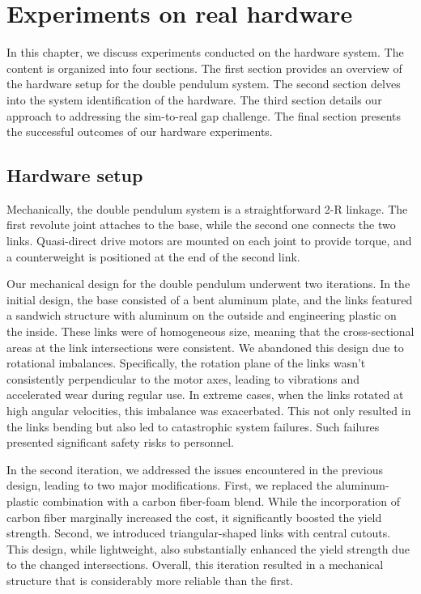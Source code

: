 \chapter{Experiments on real hardware}
In this chapter, we discuss experiments conducted on the hardware system. The content is organized into four sections. The first section provides an overview of the hardware setup for the double pendulum system. The second section delves into the system identification of the hardware. The third section details our approach to addressing the sim-to-real gap challenge. The final section presents the successful outcomes of our hardware experiments.

\section{Hardware setup}
Mechanically, the double pendulum system is a straightforward 2-R linkage. The first revolute joint attaches to the base, while the second one connects the two links. Quasi-direct drive motors are mounted on each joint to provide torque, and a counterweight is positioned at the end of the second link.

Our mechanical design for the double pendulum underwent two iterations. In the initial design, the base consisted of a bent aluminum plate, and the links featured a sandwich structure with aluminum on the outside and engineering plastic on the inside. These links were of homogeneous size, meaning that the cross-sectional areas at the link intersections were consistent. We abandoned this design due to rotational imbalances. Specifically, the rotation plane of the links wasn't consistently perpendicular to the motor axes, leading to vibrations and accelerated wear during regular use. In extreme cases, when the links rotated at high angular velocities, this imbalance was exacerbated. This not only resulted in the links bending but also led to catastrophic system failures. Such failures presented significant safety risks to personnel.

In the second iteration, we addressed the issues encountered in the previous design, leading to two major modifications. First, we replaced the aluminum-plastic combination with a carbon fiber-foam blend. While the incorporation of carbon fiber marginally increased the cost, it significantly boosted the yield strength. Second, we introduced triangular-shaped links with central cutouts. This design, while lightweight, also substantially enhanced the yield strength due to the changed intersections. Overall, this iteration resulted in a mechanical structure that is considerably more reliable than the first.

